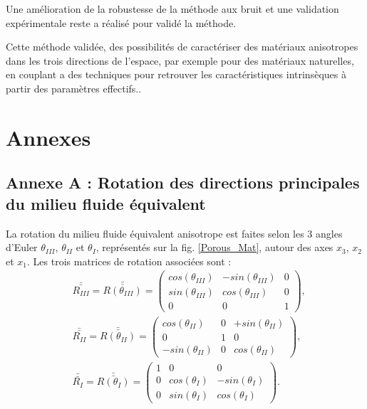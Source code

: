 \documentclass[twoside,openright]{report}
\begin{document}
    Une amélioration de la robustesse de la méthode aux bruit et une validation expérimentale reste a réalisé pour validé la méthode. 
    
    Cette méthode validée, des possibilités de caractériser des matériaux anisotropes dans les trois directions de l'espace, par exemple pour des matériaux naturelles, en couplant a des techniques pour retrouver les caractéristiques intrinsèques à partir des paramètres effectifs.\cite{Niskanen}. 




\chapter*{Annexes}
\section*{Annexe A : Rotation des directions principales du milieu fluide équivalent}
\label{Ch_Ann_S_rot}

    La rotation du milieu fluide équivalent anisotrope est faites selon les 3 angles d'Euler $\theta_{III}$, $\theta_{II}$ et $\theta_{I}$, représentés sur la fig. \ref{Porous_Mat}, autour des axes $x_3$, $x_2$ et $x_1$. Les trois matrices de rotation associées sont :
    \begin{align}
        &\bar{\bar{R_{III}}}=\bar{\bar{R(\theta_{III})}}=\begin{pmatrix} 
                                    cos(\theta_{III}) & -sin(\theta_{III}) & 0 \\
                                    sin(\theta_{III}) & cos(\theta_{III}) & 0 \\
                                    0 & 0 & 1
                                \end{pmatrix},\\
        &\bar{\bar{R_{II}}}=\bar{\bar{R(\theta_{II})}}=\begin{pmatrix} 
                                    cos(\theta_{II}) & 0 & +sin(\theta_{II})\\
                                    0 & 1 & 0 \\
                                    -sin(\theta_{II}) & 0 & cos(\theta_{II})
                                \end{pmatrix},\\
        &\bar{\bar{R_{I}}}=\bar{\bar{R(\theta_{I})}}=\begin{pmatrix} 
                                    1 & 0 & 0\\
                                    0 & cos(\theta_{I}) & -sin(\theta_{I}) \\
                                    0 & sin(\theta_{I}) & cos(\theta_{I}) 
                                \end{pmatrix}.\\
    \end{align}
    
\end{document}
